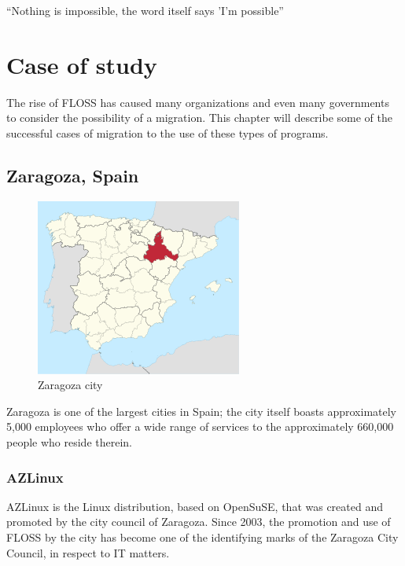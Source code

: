 \newpage
\begin{savequote}[108mm]
``Nothing is impossible, the word itself says 'I'm possible''
\end{savequote}
\chapter{Case of study}
\label{chap:Caseofstudy}
\vspace{-2cm}
The rise of FLOSS has caused many organizations and even many governments to consider the possibility of a migration. This chapter will describe some of the successful cases of migration to the use of these types of programs. 

\section {Zaragoza, Spain}
\label{Zaragoza}

\begin{figure}[H]
\centering
    \includegraphics[scale=0.8]{img/Zaragoza.png} 
  \caption{Zaragoza city}
    \end{figure}
Zaragoza is one of the largest cities in Spain; the city itself boasts approximately 5,000 employees who offer a wide range of services to the approximately 660,000 people who reside therein. 

\subsection{AZLinux}

AZLinux is the Linux distribution, based on OpenSuSE, that was created and promoted by the city council of Zaragoza. Since 2003, the promotion and use of  FLOSS by the city has become one of the identifying marks of the Zaragoza City Council, in respect to IT matters.

